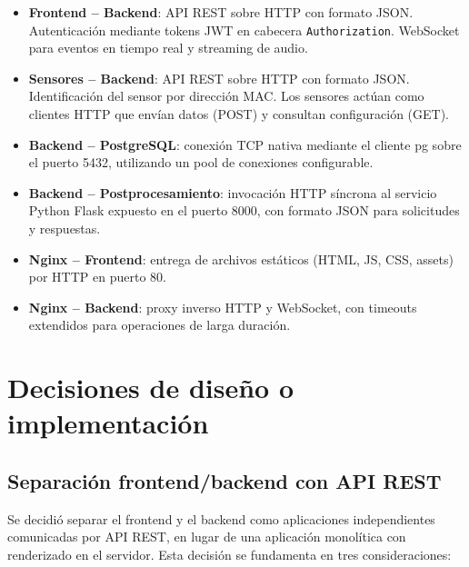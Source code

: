 \begin{itemize}
    \item \textbf{Frontend -- Backend}: API REST sobre HTTP con formato JSON.
    Autenticación mediante tokens JWT en cabecera \texttt{Authorization}.
    WebSocket para eventos en tiempo real y streaming de audio.

    \item \textbf{Sensores -- Backend}: API REST sobre HTTP con formato JSON.
    Identificación del sensor por dirección MAC. Los sensores actúan como
    clientes HTTP que envían datos (POST) y consultan configuración (GET).

    \item \textbf{Backend -- PostgreSQL}: conexión TCP nativa mediante el
    cliente pg sobre el puerto 5432, utilizando un pool de conexiones
    configurable.

    \item \textbf{Backend -- Postprocesamiento}: invocación HTTP síncrona al
    servicio Python Flask expuesto en el puerto 8000, con formato JSON para
    solicitudes y respuestas.

    \item \textbf{Nginx -- Frontend}: entrega de archivos estáticos (HTML, JS,
    CSS, assets) por HTTP en puerto 80.

    \item \textbf{Nginx -- Backend}: proxy inverso HTTP y WebSocket, con
    timeouts extendidos para operaciones de larga duración.
\end{itemize}

\section{Decisiones de diseño o implementación}

\subsection{Separación frontend/backend con API REST}

Se decidió separar el frontend y el backend como aplicaciones independientes
comunicadas por API REST, en lugar de una aplicación monolítica con renderizado
en el servidor. Esta decisión se fundamenta en tres consideraciones:


